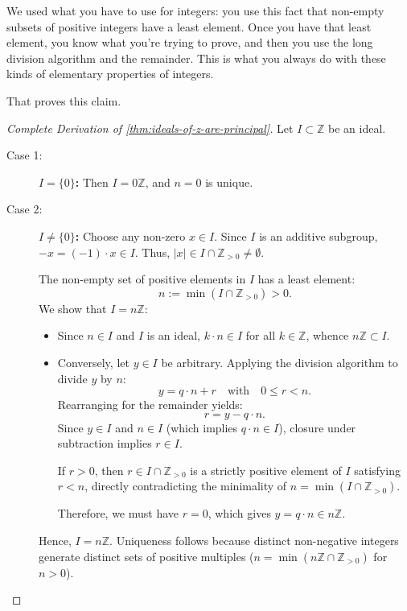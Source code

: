 \begin{proofWrapper}
\begin{speech}[00:56:10 - 00:56:31]
We used what you have to use for integers: you use this fact that non-empty subsets of positive integers have a least element. Once you have that least element, you know what you're trying to prove, and then you use the long division algorithm and the remainder. This is what you always do with these kinds of elementary properties of integers.

That proves this claim. 
\end{speech}

\begin{content}
\begin{proof}[Complete Derivation of \cref{thm:ideals-of-z-are-principal}]
Let $I \subset \mathbb{Z}$ be an ideal.
\begin{description}
    \item[Case 1:] \textbf{$I = \{0\}$:} Then $I = 0\mathbb{Z}$, and $n = 0$ is unique.
    \item[Case 2:] \textbf{$I \neq \{0\}$:} Choose any non-zero $x \in I$. Since $I$ is an additive subgroup, $-x = (-1) \cdot x \in I$. Thus, $|x| \in I \cap \mathbb{Z}_{>0} \neq \emptyset$.
    
    The non-empty set of positive elements in $I$ has a least element:
    \[
    n := \min(I \cap \mathbb{Z}_{>0}) > 0.
    \]
    We show that $I = n\mathbb{Z}$:
    \begin{itemize}
        \item Since $n \in I$ and $I$ is an ideal, $k \cdot n \in I$ for all $k \in \mathbb{Z}$, whence $n\mathbb{Z} \subset I$.
        \item Conversely, let $y \in I$ be arbitrary. Applying the division algorithm to divide $y$ by $n$:
        \[
        y = q \cdot n + r \quad \text{with} \quad 0 \le r < n.
        \]
        Rearranging for the remainder yields:
        \[
        r = y - q \cdot n.
        \]
        Since $y \in I$ and $n \in I$ (which implies $q \cdot n \in I$), closure under subtraction implies $r \in I$.
        
        If $r > 0$, then $r \in I \cap \mathbb{Z}_{>0}$ is a strictly positive element of $I$ satisfying $r < n$, directly contradicting the minimality of $n = \min(I \cap \mathbb{Z}_{>0})$.
        
        Therefore, we must have $r = 0$, which gives $y = q \cdot n \in n\mathbb{Z}$.
    \end{itemize}
    Hence, $I = n\mathbb{Z}$. Uniqueness follows because distinct non-negative integers generate distinct sets of positive multiples ($n = \min(n\mathbb{Z} \cap \mathbb{Z}_{>0})$ for $n > 0$).
\end{description}
\end{proof}
\end{content}

\end{proofWrapper}


